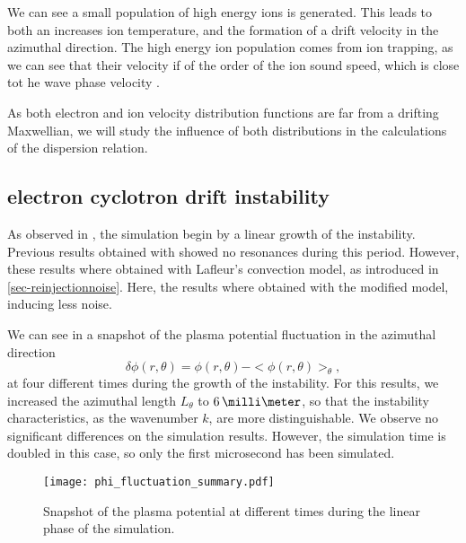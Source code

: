   We can see a small population of high energy ions is generated.
  This leads to both an increases ion temperature, and the formation of a drift velocity in the azimuthal direction.
  The high energy ion population comes from ion trapping, as we can see that their velocity if of the order of the ion sound speed, which is close tot he wave phase velocity \citet{lafleur2018}.
  
  \vspace{1em}
  As both electron and ion velocity distribution functions are far from a drifting Maxwellian, we will study the influence of both distributions in the calculations of the dispersion relation.
  
  
  
  \subsection{electron cyclotron drift instability} \label{subsec-ECDIPIC}
  
  
    As observed in , the simulation begin by a linear growth of the instability.
    Previous results obtained with \LPPic \citet{croes2017a} showed no resonances during this period.
    However, these results where obtained with Lafleur's convection model, as introduced in \cref{sec-reinjectionnoise}.
    Here, the results where obtained with the modified model, inducing less noise.
    
    We can see in   a snapshot of the plasma potential fluctuation in the azimuthal direction \[ \delta \phi(r, \theta) = \phi(r, \theta) - < \phi(r, \theta) >_{ \theta}, \]
    at four different times during the growth of the instability.
    For this results, we increased the azimuthal length $L_{\theta}$ to $6\,\milli\meter$, so that the instability characteristics, as the wavenumber $k$, are more distinguishable.
    We observe no significant differences on the simulation results.
    However, the simulation time is doubled in this case, so only the first microsecond has been simulated.
    

    
    \begin{figure}[hbtp]
      \centering
      \texttt{[image: phi\_fluctuation\_summary.pdf]}
      \caption{Snapshot of the plasma potential at different times during the linear phase of the simulation.}
      \label{fig-phi_fluctuation_summary}
    \end{figure}
    
